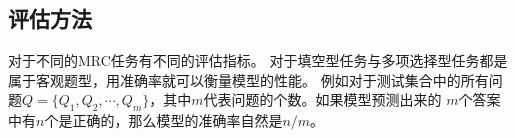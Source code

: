 
\subsection{评估方法}
对于不同的MRC任务有不同的评估指标。
对于填空型任务与多项选择型任务都是属于客观题型，用准确率就可以衡量模型的性能。
例如对于测试集合中的所有问题$Q=\{Q_1,$$Q_2,\cdots,Q_m\}$，其中$m$代表问题的个数。如果模型预测出来的
$m$个答案中有$n$个是正确的，那么模型的准确率自然是$n/m$。

